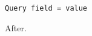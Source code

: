\documentclass{article}
\begin{document}
\begin{lstlisting}
Query field = value
\end{lstlisting}
After.
\end{document}
